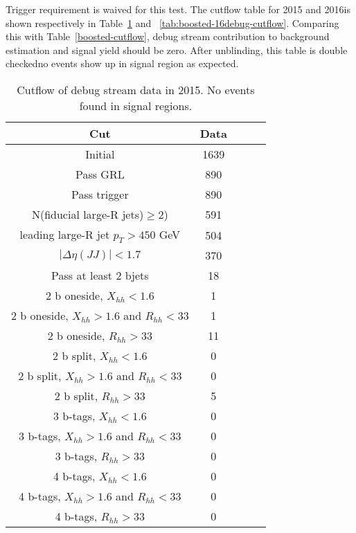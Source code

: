 Trigger requirement is waived for this test. The cutflow table for 2015 and 2016is shown respectively in Table~\ref{tab:boosted-15debug-cutflow} and ~\ref{tab:boosted-16debug-cutflow}. Comparing this with Table~\ref{boosted-cutflow}, debug stream contribution to background estimation and signal yield should be zero. After unblinding, this table is double checkedno events show up in signal region as expected.

\begin{table}[htbp!]
\begin{center}
\begin{tabular}{c|c|c|c|c}
Cut & Data \\
\hline
Initial & 1639  \\
Pass GRL & 890 \\
Pass trigger & 890 \\
N(fiducial large-R jets)$\geq 2$) & 591 \\
leading large-R jet $p_{T}>450$ GeV & 504 \\
$|\Delta\eta(JJ)|<1.7$ & 370 \\
Pass at least 2 bjets & 18 \\
\hline
2 b oneside, $X_{hh}<1.6$ & 1 \\
2 b oneside, $X_{hh}>1.6$ and $R_{hh}<33$ & 1 \\
2 b oneside, $R_{hh}>33$ & 11 \\
\hline
\hline
2 b split, $X_{hh}<1.6$ & 0 \\
2 b split, $X_{hh}>1.6$ and $R_{hh}<33$ & 0 \\
2 b split, $R_{hh}>33$ & 5 \\
\hline
\hline
3 b-tags, $X_{hh}<1.6$ & 0 \\
3 b-tags, $X_{hh}>1.6$ and $R_{hh}<33$ & 0 \\
3 b-tags, $R_{hh}>33$ & 0 \\
\hline
4 b-tags, $X_{hh}<1.6$ & 0 \\
4 b-tags, $X_{hh}>1.6$ and $R_{hh}<33$ & 0 \\
4 b-tags, $R_{hh}>33$ & 0 \\
\hline
\end{tabular}
\end{center}
\caption{Cutflow of debug stream data in 2015. No events found in signal regions.}
\label{tab:boosted-15debug-cutflow}
\end{table}


